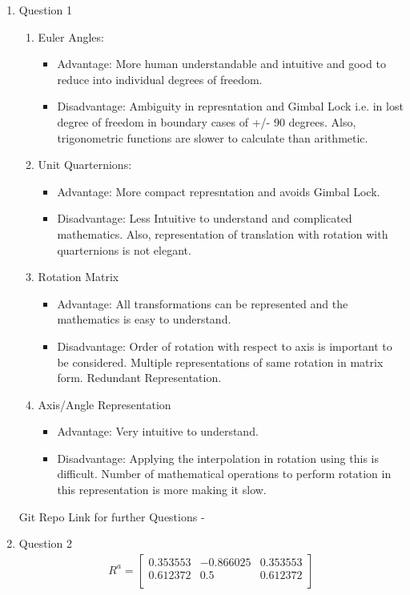 \documentclass[paper=a4, fontsize=11pt]{scrartcl} %
\numberwithin{equation}{section} %
\numberwithin{figure}{section} %
\numberwithin{table}{section} %
\begin{document}
\begin{enumerate}
\item Question 1
\begin{enumerate}
\item Euler Angles:
\begin{itemize}
\item Advantage: More human understandable and intuitive and good to reduce into individual degrees of freedom.
\item Disadvantage: Ambiguity in represntation and Gimbal Lock i.e. in lost degree of freedom in boundary cases of +/- 90 degrees. Also, trigonometric functions are slower to calculate than arithmetic.
\end{itemize}
\item Unit Quarternions:
\begin{itemize}
\item Advantage: More compact represntation and avoids Gimbal Lock.
\item Disadvantage: Less Intuitive to understand and complicated mathematics. Also, representation of translation with rotation with quarternions is not elegant.
\end{itemize}
\item Rotation Matrix
\begin{itemize}
\item Advantage: All transformations can be represented and the mathematics is easy to understand.
\item Disadvantage: Order of rotation with respect to axis is important to be considered. Multiple representations of same rotation in matrix form. Redundant Representation.
\end{itemize}
\item Axis/Angle Representation
\begin{itemize}
\item Advantage: Very intuitive to understand.
\item Disadvantage: Applying the interpolation in rotation using this is difficult. Number of mathematical operations to perform rotation in this representation is more making it slow.
\end{itemize}
\end{enumerate}
Git Repo Link for further Questions - 
\item Question 2
\begin{align}
R^{a} = 
\begin{bmatrix}
0.353553 &-0.866025  &0.353553 \\
0.612372  &0.5  &0.612372 \\

\end{bmatrix}
\end{align}
\end{enumerate}
\end{document}
